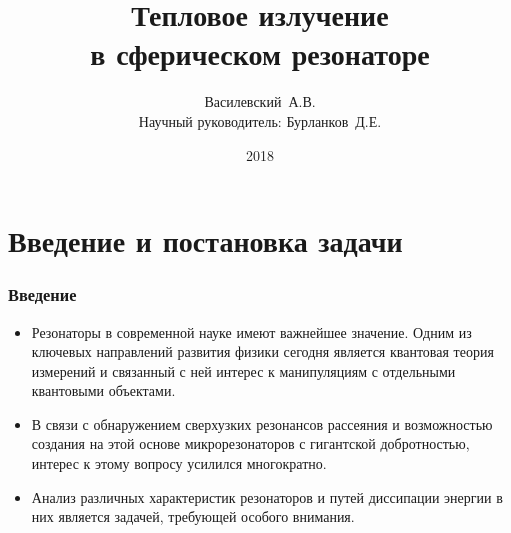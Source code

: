 \documentclass[compress]{beamer}
\title{Тепловое излучение\\ в сферическом резонаторе}
\author[Василевский~А.В.]{
    Василевский~А.В. \\[\baselineskip]
    {\footnotesize Научный руководитель: Бурланков~Д.Е.}
}
\institute[ННГУ]{Нижегородский университет им. Н.И.~Лобачевского}
\date{2018}
\begin{document}

    \frame[plain]{\titlepage}


    \section[Введение]{Введение и постановка задачи}


    \begin{frame}\frametitle{Введение}

        \begin{itemize}\justifying

            \item Резонаторы в современной науке имеют важнейшее значение. Одним из ключевых направлений развития физики сегодня является квантовая теория измерений и связанный с ней интерес к манипуляциям с отдельными квантовыми объектами.

            \item В связи с обнаружением сверхузких резонансов рассеяния и возможностью создания на этой основе микрорезонаторов с гигантской добротностью, интерес к этому вопросу усилился многократно.

            \item Анализ различных характеристик резонаторов и путей диссипации энергии в них является задачей, требующей особого внимания.

        \end{itemize}

    \end{frame}

\end{document}
